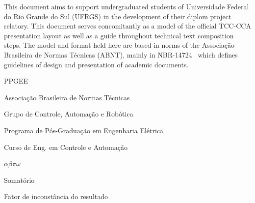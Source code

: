 \documentclass[repeatfields,xlists,xpacks,oneside]{ufrgscca}
\begin{document}


\begin{otherabstract}
This document aims to support undergraduated students  of Universidade Federal do Rio
Grande do Sul (UFRGS) in the development of their diplom project relatory.
This document serves concomitantly as a model of the official TCC-CCA
presentation layout as well as a guide throughout technical text composition
steps. The model and format held here are based in norms of the Associação
Brasileira de Normas Técnicas (ABNT), mainly in
NBR-14724~\cite{ABNT:NBR-14724-2011} which defines guidelines of design and
presentation of academic documents.
\end{otherabstract}


\setcounter{tocdepth}{3}

\listoffigures

\listoftables

\listofcodelist %

\begin{listofabbrv}{PPGEE}
	\item[ABNT] Associação Brasileira de Normas Técnicas
	\item[GCAR] Grupo de Controle, Automação e Robótica
	\item[PPGEE] Programa de Pós-Graduação em Engenharia Elétrica
	\item[CCA] Curso de Eng. em Controle e Automação
\end{listofabbrv}

\begin{listofsymbols}{$\alpha\beta\pi\omega$}
       \item[$\sum$] Somatório
       \item[$\alpha\beta\pi\omega$] Fator de inconstância do resultado
\end{listofsymbols}


\tableofcontents
\end{document}

